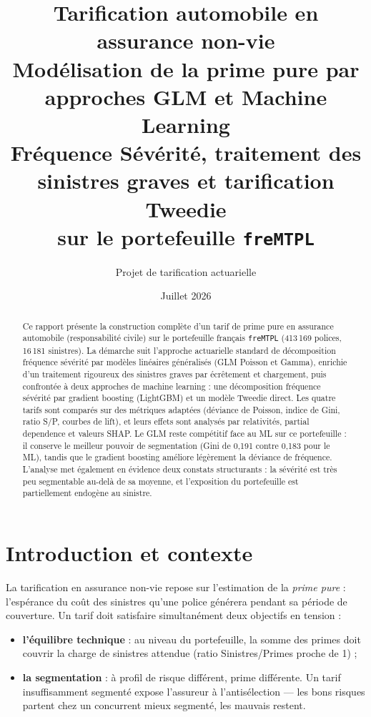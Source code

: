 \documentclass[11pt,a4paper]{article}
\title{
    \vspace{1cm}
    {\Large Tarification automobile en assurance non-vie}\\[0.4cm]
    {\huge \bfseries Modélisation de la prime pure par approches GLM et Machine Learning}\\[0.5cm]
    {\large Fréquence \texttimes{} Sévérité, traitement des sinistres graves et tarification Tweedie\\ sur le portefeuille \texttt{freMTPL}}
    \vspace{1cm}
}
\author{Projet de tarification actuarielle}
\date{Juillet 2026}
\begin{document}
\maketitle
\vfill
\begin{abstract}
\noindent
Ce rapport présente la construction complète d'un tarif de prime pure en assurance automobile (responsabilité civile) sur le portefeuille français \texttt{freMTPL} (413\,169 polices, 16\,181 sinistres). La démarche suit l'approche actuarielle standard de décomposition fréquence \texttimes{} sévérité par modèles linéaires généralisés (GLM Poisson et Gamma), enrichie d'un traitement rigoureux des sinistres graves par écrêtement et chargement, puis confrontée à deux approches de machine learning : une décomposition fréquence \texttimes{} sévérité par gradient boosting (LightGBM) et un modèle Tweedie direct. Les quatre tarifs sont comparés sur des métriques adaptées (déviance de Poisson, indice de Gini, ratio S/P, courbes de lift), et leurs effets sont analysés par relativités, partial dependence et valeurs SHAP. Le GLM reste compétitif face au ML sur ce portefeuille : il conserve le meilleur pouvoir de segmentation (Gini de 0{,}191 contre 0{,}183 pour le ML), tandis que le gradient boosting améliore légèrement la déviance de fréquence. L'analyse met également en évidence deux constats structurants : la sévérité est très peu segmentable au-delà de sa moyenne, et l'exposition du portefeuille est partiellement endogène au sinistre.
\end{abstract}
\vfill
\newpage

\tableofcontents
\newpage

\section{Introduction et contexte}

La tarification en assurance non-vie repose sur l'estimation de la \emph{prime pure} : l'espérance du coût des sinistres qu'une police générera pendant sa période de couverture. Un tarif doit satisfaire simultanément deux objectifs en tension :

\begin{itemize}
    \item \textbf{l'équilibre technique} : au niveau du portefeuille, la somme des primes doit couvrir la charge de sinistres attendue (ratio Sinistres/Primes proche de 1) ;
    \item \textbf{la segmentation} : à profil de risque différent, prime différente. Un tarif insuffisamment segmenté expose l'assureur à l'antisélection --- les bons risques partent chez un concurrent mieux segmenté, les mauvais restent.
\end{itemize}
\end{document}
